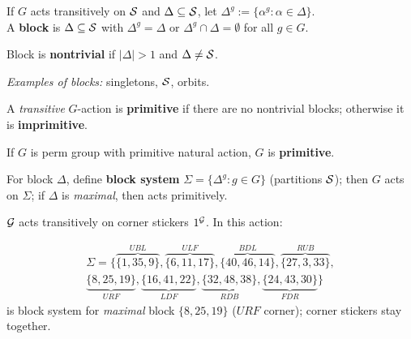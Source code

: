 \begin{slide}
    \begin{definition}[block]
        \vspace{0pt}
        If $G$ acts transitively on $\mathcal{S}$ and $\Delta \subseteq \mathcal{S}$, let $\Delta^g := \{\alpha^g : \alpha \in \Delta\}$. \\
        A \textbf{block} is $\Delta \subseteq \mathcal{S}$ with $\Delta^g = \Delta$ or $\Delta^g \cap \Delta = \emptyset$ for all $g \in G$. \pause

        Block is \textbf{nontrivial} if $|\Delta| > 1$ and $\Delta \neq \mathcal{S}$.
    \end{definition}

    \textit{Examples of blocks:} singletons, $\mathcal{S}$, orbits. \pause

    \begin{definition}[primitivity]
        \vspace{0pt}
        A \textit{transitive} $G$-action is \textbf{primitive} if there are no nontrivial blocks; otherwise it is \textbf{imprimitive}.

        If $G$ is perm group with primitive natural action, $G$ is \textbf{primitive}.
    \end{definition} \pause

    For block $\Delta$, define \textbf{block system} $\Sigma = \{\Delta^g : g \in G\}$ (partitions $\mathcal{S}$); then $G$ acts on $\Sigma$; if $\Delta$ is \textit{maximal}, then acts primitively.
\end{slide}

\begin{slide}
    $\mathcal{G}$ acts transitively on corner stickers $1^{\mathcal{G}}$. In this action:

    \begin{center}
    \end{center} \pause

    \vspace{-1cm}
    \begin{multline*}
        \Sigma = \{\overbrace{\{1,35,9\}}^{UBL},\overbrace{\{6,11,17\}}^{ULF},\overbrace{\{40,46,14\}}^{BDL},\overbrace{\{27,3,33\}}^{RUB},\\
        \underbrace{\{8,25,19\}}_{URF},\underbrace{\{16,41,22\}}_{LDF},\underbrace{\{32,48,38\}}_{RDB},\underbrace{\{24,43,30\}}_{FDR}\}
    \end{multline*}
    is block system for \textit{maximal} block $\{8,25,19\}$ ($URF$ corner); corner stickers stay together.
\end{slide}

